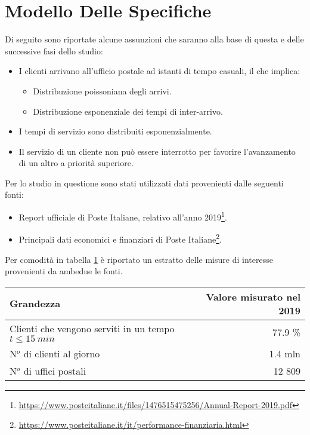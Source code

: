\section{Modello Delle Specifiche}\label{sec:modello-specfiche}
Di seguito sono riportate alcune assunzioni che saranno alla base di questa e delle successive fasi dello studio:
\begin{itemize}
\item I clienti arrivano all'ufficio postale ad istanti di tempo casuali, il che implica:
\begin{itemize}
\item Distribuzione poissoniana degli arrivi.
\item Distribuzione esponenziale dei tempi di inter-arrivo.
\end{itemize}
\item I tempi di servizio sono distribuiti esponenzialmente.
\item Il servizio di un cliente non può essere interrotto per favorire l'avanzamento di un altro a priorità superiore.
\end{itemize}

Per lo studio in questione sono stati utilizzati dati provenienti dalle seguenti fonti:
\begin{itemize}
\item Report ufficiale di Poste Italiane, relativo all'anno 2019\footnote{\url{https://www.posteitaliane.it/files/1476515475256/Annual-Report-2019.pdf}}.
\item Principali dati economici e finanziari di Poste Italiane\footnote{\url{https://www.posteitaliane.it/it/performance-finanziaria.html}}.
\end{itemize}

Per comodità in tabella \ref{table:modello-specifiche-1} è riportato un estratto delle misure di interesse provenienti da ambedue le fonti.

\begin{table}[ht]
\centering
{\tablecolors
\begin{tabular}{| l | r |}
\hline
Grandezza & Valore misurato nel 2019 \\
\hline
Clienti che vengono serviti in un tempo $t\leq 15\ min$ & 77.9 \% \\
\hline
N$^o$ di clienti al giorno & 1.4 mln \\
\hline
N$^o$ di uffici postali & 12 809 \\
\hline
\end{tabular}}
\label{table:modello-specifiche-1}
\end{table}

